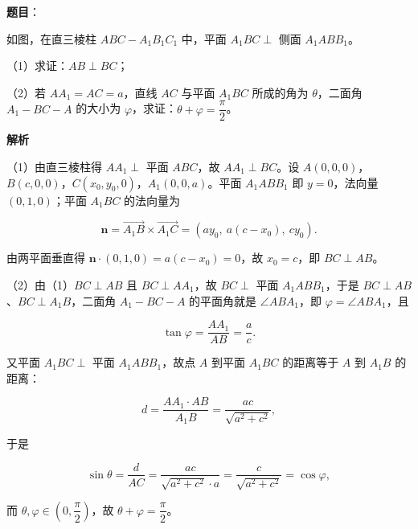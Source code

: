 \begin{answer}

\textbf{题目}：

如图，在直三棱柱 $ABC-A_1B_1C_1$ 中，平面 $A_1BC\perp$ 侧面 $A_1ABB_1$。

（1）求证：$AB\perp BC$；

（2）若 $AA_1=AC=a$，直线 $AC$ 与平面 $A_1BC$ 所成的角为 $\theta$，二面角 $A_1-BC-A$ 的大小为 $\varphi$，求证：$\theta+\varphi=\dfrac{\pi}2$。
\nopagebreak[4]
\begin{center}\end{center}
\nopagebreak[4]
\textbf{解析}

（1）由直三棱柱得 $AA_1\perp$ 平面 $ABC$，故 $AA_1\perp BC$。设 $A(0,0,0)$，$B(c,0,0)$，$C(x_0,y_0,0)$，$A_1(0,0,a)$。平面 $A_1ABB_1$ 即 $y=0$，法向量 $(0,1,0)$；平面 $A_1BC$ 的法向量为

\nopagebreak[4]
\[\boldsymbol n=\overrightarrow{A_1B}\times\overrightarrow{A_1C}=(ay_0,\ a(c-x_0),\ cy_0).\]

由两平面垂直得 $\boldsymbol n\cdot(0,1,0)=a(c-x_0)=0$，故 $x_0=c$，即 $BC\perp AB$。

（2）由（1）$BC\perp AB$ 且 $BC\perp AA_1$，故 $BC\perp$ 平面 $A_1ABB_1$，于是 $BC\perp AB$、$BC\perp A_1B$，二面角 $A_1-BC-A$ 的平面角就是 $\angle ABA_1$，即 $\varphi=\angle ABA_1$，且

\nopagebreak[4]
\[\tan\varphi=\frac{AA_1}{AB}=\frac ac.\]

又平面 $A_1BC\perp$ 平面 $A_1ABB_1$，故点 $A$ 到平面 $A_1BC$ 的距离等于 $A$ 到 $A_1B$ 的距离：

\nopagebreak[4]
\[d=\frac{AA_1\cdot AB}{A_1B}=\frac{ac}{\sqrt{a^2+c^2}},\]

于是

\nopagebreak[4]
\[\sin\theta=\frac d{AC}=\frac{ac}{\sqrt{a^2+c^2}\cdot a}=\frac c{\sqrt{a^2+c^2}}=\cos\varphi,\]

而 $\theta,\varphi\in\left(0,\dfrac{\pi}2\right)$，故 $\theta+\varphi=\dfrac{\pi}2$。


\end{answer}
